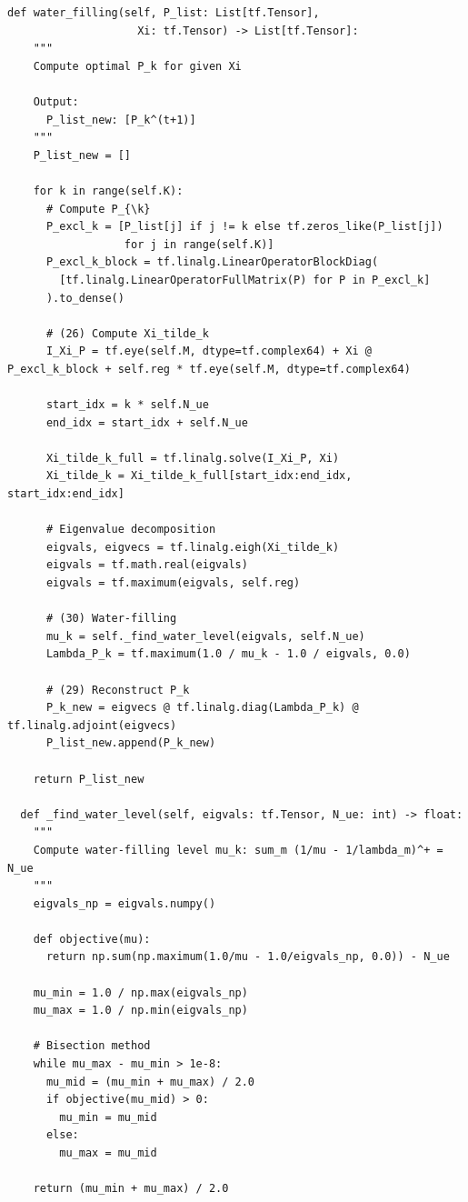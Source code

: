 \documentclass[10pt]{article}
\begin{document}
\begin{lstlisting}[caption={Water-Filling Method}]
  def water_filling(self, P_list: List[tf.Tensor], 
                    Xi: tf.Tensor) -> List[tf.Tensor]:
    """
    Compute optimal P_k for given Xi
    
    Output:
      P_list_new: [P_k^(t+1)]
    """
    P_list_new = []
    
    for k in range(self.K):
      # Compute P_{\k}
      P_excl_k = [P_list[j] if j != k else tf.zeros_like(P_list[j]) 
                  for j in range(self.K)]
      P_excl_k_block = tf.linalg.LinearOperatorBlockDiag(
        [tf.linalg.LinearOperatorFullMatrix(P) for P in P_excl_k]
      ).to_dense()
      
      # (26) Compute Xi_tilde_k
      I_Xi_P = tf.eye(self.M, dtype=tf.complex64) + Xi @ P_excl_k_block + self.reg * tf.eye(self.M, dtype=tf.complex64)
      
      start_idx = k * self.N_ue
      end_idx = start_idx + self.N_ue
      
      Xi_tilde_k_full = tf.linalg.solve(I_Xi_P, Xi)
      Xi_tilde_k = Xi_tilde_k_full[start_idx:end_idx, start_idx:end_idx]
      
      # Eigenvalue decomposition
      eigvals, eigvecs = tf.linalg.eigh(Xi_tilde_k)
      eigvals = tf.math.real(eigvals)
      eigvals = tf.maximum(eigvals, self.reg)
      
      # (30) Water-filling
      mu_k = self._find_water_level(eigvals, self.N_ue)
      Lambda_P_k = tf.maximum(1.0 / mu_k - 1.0 / eigvals, 0.0)
      
      # (29) Reconstruct P_k
      P_k_new = eigvecs @ tf.linalg.diag(Lambda_P_k) @ tf.linalg.adjoint(eigvecs)
      P_list_new.append(P_k_new)
    
    return P_list_new
  
  def _find_water_level(self, eigvals: tf.Tensor, N_ue: int) -> float:
    """
    Compute water-filling level mu_k: sum_m (1/mu - 1/lambda_m)^+ = N_ue
    """
    eigvals_np = eigvals.numpy()
    
    def objective(mu):
      return np.sum(np.maximum(1.0/mu - 1.0/eigvals_np, 0.0)) - N_ue
    
    mu_min = 1.0 / np.max(eigvals_np)
    mu_max = 1.0 / np.min(eigvals_np)
    
    # Bisection method
    while mu_max - mu_min > 1e-8:
      mu_mid = (mu_min + mu_max) / 2.0
      if objective(mu_mid) > 0:
        mu_min = mu_mid
      else:
        mu_max = mu_mid
    
    return (mu_min + mu_max) / 2.0
\end{lstlisting}
\end{document}

